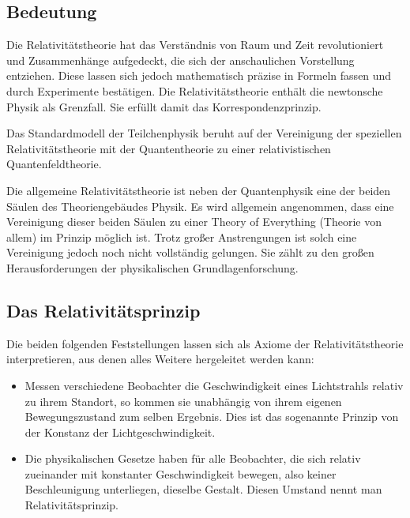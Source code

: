 \begin{nohyphens}
\subsection*{Bedeutung}

Die Relativitätstheorie hat das Verständnis von Raum und Zeit revolutioniert und Zusammenhänge aufgedeckt, die sich der anschaulichen Vorstellung entziehen. Diese lassen sich jedoch mathematisch präzise in Formeln fassen und durch Experimente bestätigen. Die Relativitätstheorie enthält die newtonsche Physik als Grenzfall. Sie erfüllt damit das Korrespondenzprinzip.

Das Standardmodell der Teilchenphysik beruht auf der Vereinigung der speziellen Relativitätstheorie mit der Quantentheorie zu einer relativistischen Quantenfeldtheorie.

Die allgemeine Relativitätstheorie ist neben der Quantenphysik eine der beiden Säulen des Theoriengebäudes Physik. Es wird allgemein angenommen, dass eine Vereinigung dieser beiden Säulen zu einer Theory of Everything (Theorie von allem) im Prinzip möglich ist. Trotz großer Anstrengungen ist solch eine Vereinigung jedoch noch nicht vollständig gelungen. Sie zählt zu den großen Herausforderungen der physikalischen Grundlagenforschung.

\subsection{Das Relativitätsprinzip}

Die beiden folgenden Feststellungen lassen sich als Axiome der Relativitätstheorie interpretieren, aus denen alles Weitere hergeleitet werden kann:

\begin{itemize}\Lf
  \item Messen verschiedene Beobachter die Geschwindigkeit eines Lichtstrahls relativ zu ihrem Standort, so kommen sie unabhängig von ihrem eigenen Bewegungszustand zum selben Ergebnis. Dies ist das sogenannte Prinzip von der Konstanz der Lichtgeschwindigkeit.
  \item Die physikalischen Gesetze haben für alle Beobachter, die sich relativ zueinander mit konstanter Geschwindigkeit bewegen, also keiner Beschleunigung unterliegen, dieselbe Gestalt. Diesen Umstand nennt man Relativitätsprinzip.
\end{itemize}


\end{nohyphens}
